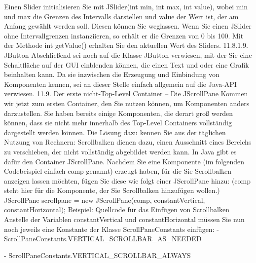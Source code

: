 Einen Slider initialisieren Sie mit JSlider(int min, int max, int value), wobei min und max die Grenzen des Intervalls darstellen und value der Wert ist, der am Anfang gewählt werden soll. Diesen können Sie weglassen. Wenn Sie einen JSlider ohne Intervallgrenzen instanziieren, so erhält er die Grenzen von 0 bis 100.
Mit der Methode int getValue() erhalten Sie den aktuellen Wert des Sliders.
11.8.1.9.	JButton
Abschließend sei noch auf die Klasse JButton verwiesen, mit der Sie eine Schaltfläche auf der GUI einblenden können, die einen Text und oder eine Grafik beinhalten kann. Da sie inzwischen die Erzeugung und Einbindung von Komponenten kennen, sei an dieser Stelle einfach allgemein auf die Java-API verwiesen.
11.9.	Der erste nicht-Top-Level Container – Die JScrollPane
Kommen wir jetzt zum ersten Container, den Sie nutzen können, um Komponenten anders darzustellen. Sie haben bereits einige Komponenten, die derart groß werden können, dass sie nicht mehr innerhalb des Top-Level Containers vollständig dargestellt werden können. Die Lösung dazu kennen Sie aus der täglichen Nutzung von Rechnern: Scrollbalken dienen dazu, einen Ausschnitt eines Bereichs zu verschieben, der nicht vollständig abgebildet werden kann.
In Java gibt es dafür den Container JScrollPane.
Nachdem Sie eine Komponente (im folgenden Codebeispiel einfach comp genannt) erzeugt haben, für die Sie Scrollbalken anzeigen lassen möchten, fügen Sie diese wie folgt einer JScrollPane hinzu: (comp steht hier für die Komponente, der Sie Scrollbalken hinzufügen wollen.)
JScrollPane scrollpane = new JScrollPane(comp, constantVertical, constantHorizontal);
Beispiel: Quellcode für das Einfügen von Scrollbalken
Anstelle der Variablen constantVertical und constantHorizontal müssen Sie nun noch jeweils eine Konstante der Klasse ScrollPaneConstants einfügen:
-	ScrollPaneConstants.VERTICAL_SCROLLBAR_AS_NEEDED

-	ScrollPaneConstants.VERTICAL_SCROLLBAR_ALWAYS

